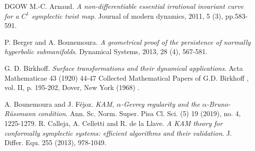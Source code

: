 \documentclass{amsart}
\begin{document}
		\begin{thebibliography}{DGOW}
			\renewcommand{\baselinestretch}{1.0}
			\setlength\itemsep{-1pt}
			\small
			  M.-C. Arnaud.
			{\it A non-differentiable essential irrational invariant curve
				for a $C^1$ symplectic twist map}. Journal of modern dynamics, 2011, 5 (3), pp.583-591.
			
			
			 P. Berger  and A. Bounemoura. {\it A geometrical proof of the persistence of normally hyperbolic submanifolds}. Dynamical Systems, 2013, 28 (4), 567-581.
			
			
			
			
			
			 G. D. Birkhoff.  {\it Surface transformations and their dynamical applications}. Acta Mathematicae 43 (1920) 44-47 Collected Mathematical Papers of G.D. Birkhoff , vol. II, p. 195-202, Dover, New York (1968) .
			
			
			
			
			 A. Bounemoura and J. F\'{e}joz. {\it KAM, $\alpha$-Gevrey regularity and the $\alpha$-Bruno-R\"{u}ssmann condition}. Ann. Sc. Norm. Super. Pisa Cl. Sci. (5) 19 (2019), no. 4, 1225-1279.
			 R. Calleja, A. Celletti and R. de la Llave. {\it A KAM theory for conformally symplectic systems: efficient algorithms and their validation}. J. Differ. Equ. {255} (2013), 978-1049.
			

\end{thebibliography}
\end{document}
